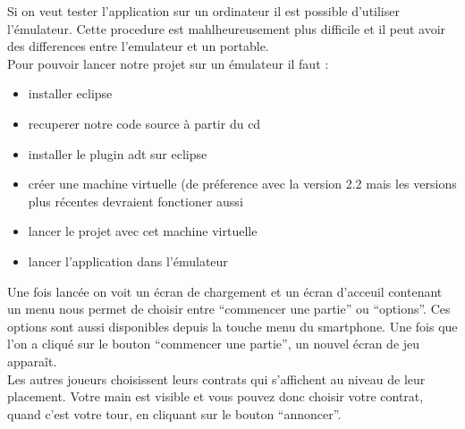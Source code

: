 \documentclass[a4paper]{report}
\begin{document}
Si on veut tester l'application sur un ordinateur il est possible d'utiliser l'émulateur. Cette procedure est mahlheureusement plus difficile et il peut avoir des differences entre l'emulateur et un portable.\\
Pour pouvoir lancer notre projet sur un émulateur il faut :
\begin{itemize}
	\item installer eclipse
	\item recuperer notre code source à partir du cd
	\item installer le plugin adt sur eclipse
	\item créer une machine virtuelle (de préference avec la version 2.2 mais les versions plus récentes devraient fonctioner aussi
	\item lancer le projet avec cet machine virtuelle
	\item lancer l'application dans l'émulateur \\
\end{itemize}

Une fois lancée on voit un écran de chargement et un écran d’acceuil contenant un menu nous permet de choisir entre “commencer une partie” ou “options”. Ces options sont aussi disponibles depuis la touche menu du smartphone.
Une fois que l’on a cliqué sur le bouton “commencer une partie”, un nouvel écran de jeu apparaît.\\
Les autres joueurs choisissent leurs contrats qui s’affichent au niveau de leur placement. Votre main est visible et vous pouvez donc choisir votre contrat, quand c’est votre tour, en cliquant sur le bouton “annoncer”.\\
\end{document}
